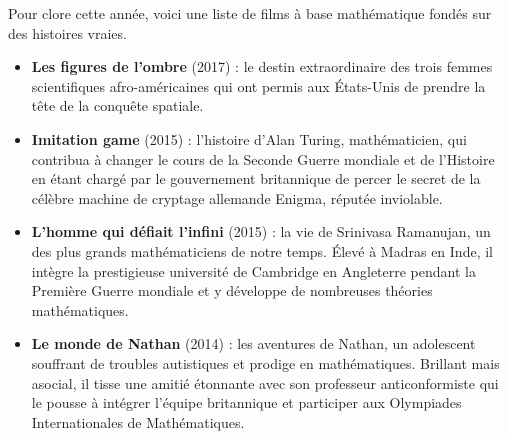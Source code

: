 \vspace*{-7mm}
\begin{changemargin}{-10mm}{-10mm}

\end{changemargin}
\vspace*{-13mm}
\begin{debat} 
   Pour clore cette année, voici une liste de films à base mathématique fondés sur des histoires vraies.
   \begin{itemize}
       \item {\bf Les figures de l'ombre} (2017) : le destin extraordinaire des trois femmes scientifiques afro-américaines qui ont permis aux États-Unis de prendre la tête de la conquête spatiale.
       \item {\bf Imitation game} (2015) : l'histoire d'Alan Turing, mathématicien, qui contribua à changer le cours de la Seconde Guerre mondiale et de l’Histoire en étant chargé par le gouvernement britannique de percer le secret de la célèbre machine de cryptage allemande Enigma, réputée inviolable.
           \item {\bf L'homme qui défiait l'infini} (2015) : la vie de Srinivasa Ramanujan, un des plus grands mathématiciens de notre temps. Élevé à Madras en Inde, il intègre la prestigieuse université de Cambridge en Angleterre pendant la Première Guerre mondiale et y développe de nombreuses théories mathématiques.
      \item {\bf Le monde de Nathan} (2014) : les aventures de Nathan, un adolescent souffrant de troubles autistiques et prodige en mathématiques. Brillant mais asocial, il tisse une amitié étonnante avec son professeur anticonformiste qui le pousse à intégrer l’équipe britannique et participer aux Olympiades Internationales de Mathématiques.
   \end{itemize}
 \end{debat}